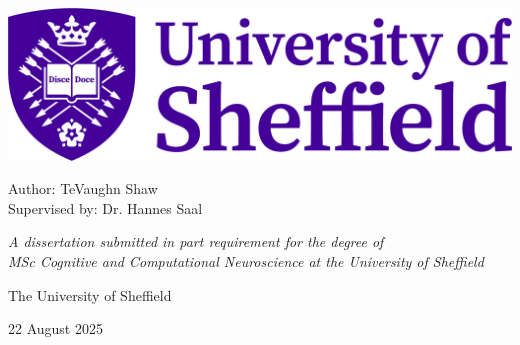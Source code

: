 \begin{center}
    \thispagestyle{empty}
    \includegraphics[width=0.5\linewidth]{images/sheffield_newlogo.jpg}

    \vspace*{2cm}

    \begin{Huge}
        \makeatletter
        \textbf{\@title}
        \makeatother
    \end{Huge}
 

     \vspace*{1.5cm}


    \vspace*{1cm}

    \begin{Large}
        Author: TeVaughn Shaw \\
        Supervised by: Dr. Hannes Saal\\
    \end{Large}

 \vspace*{2cm}

    \begin{large}
        \textit{A dissertation submitted in part requirement for the degree of} \\
        \textit{MSc Cognitive and Computational Neuroscience at the University of Sheffield}
    \end{large}

    \vspace*{1cm}
    \begin{Large}
        The University of Sheffield
    \end{Large}
    \vspace*{1cm}
    
    
    \begin{Large}
        22 August 2025
    \end{Large}
    \vspace*{1cm}
    
    \vfill
\end{center}